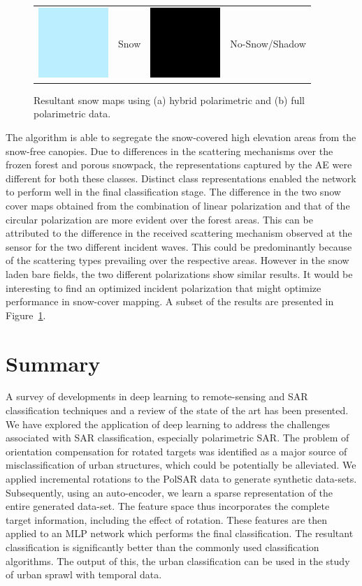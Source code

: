 \documentclass[12pt, a4paper]{article}
\begin{document}
\begin{figure}
\begin{tabular}{cccc}
\includegraphics[width=0.02\columnwidth]{Figures/SnowCover2018/Snow} & Snow & \includegraphics[width=0.02\columnwidth]{Figures/SnowCover2018/NoSnow} & No-Snow/Shadow
\end{tabular}
\caption{Resultant snow maps using (a) hybrid polarimetric and (b) full polarimetric data.}
\label{fig:results}
\end{figure}

The algorithm is able to segregate the snow-covered high elevation areas from the snow-free canopies. Due to differences in the scattering mechanisms over the frozen forest and porous snowpack, the representations captured by the AE were different for both these classes. Distinct class representations enabled the network to perform well in the final classification stage. 
%
The difference in the two snow cover maps obtained from the combination of linear polarization and that of the circular polarization are more evident over the forest areas. This can be attributed to the difference in the received scattering mechanism observed at the sensor for the two different incident waves. This could be predominantly because of the scattering types prevailing over the respective areas.
However in the snow laden bare fields, the two different polarizations show similar results. It would be interesting to find an optimized incident polarization that might optimize performance in snow-cover mapping. 
A subset of the results are presented in Figure~\ref{fig:results}.


\section{Summary}

A survey of developments in deep learning to remote-sensing and SAR classification techniques and a review of the state of the art has been presented. We have explored the application of deep learning to address the challenges associated with SAR classification, especially polarimetric SAR. The problem of orientation compensation for rotated targets was identified as a major source of misclassification of urban structures, which could be potentially be alleviated. We applied incremental rotations to the PolSAR data to generate synthetic data-sets. Subsequently, using an auto-encoder, we learn a sparse representation of the entire generated data-set. The feature space thus incorporates the complete target information, including the effect of rotation. These features are then applied to an MLP network which performs the final classification. The resultant classification is significantly better than the commonly used classification algorithms. The output of this, the urban classification can be used in the study of urban sprawl with temporal data. 
\end{document}
